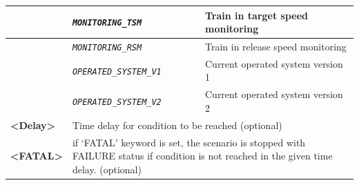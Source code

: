 \begin{itemize}
\begin{longtable}{|l|l|l|}
			\hline

			&	\begin{minipage}[t]{0.40\linewidth} \emph{\texttt{MONITORING\_TSM}} \end{minipage}
			&	\begin{minipage}[t]{0.38\linewidth} Train in target speed monitoring \end{minipage} \\

			\hline

			&	\begin{minipage}[t]{0.40\linewidth} \emph{\texttt{MONITORING\_RSM}} \end{minipage}
			&	\begin{minipage}[t]{0.38\linewidth} Train in release speed monitoring \end{minipage} \\

			\hline
			
			&	\begin{minipage}[t]{0.40\linewidth} \emph{\texttt{OPERATED\_SYSTEM\_V1}} \end{minipage}
			&	\begin{minipage}[t]{0.38\linewidth} Current operated system version 1\end{minipage} \\
			
			\hline
			
			&	\begin{minipage}[t]{0.40\linewidth} \emph{\texttt{OPERATED\_SYSTEM\_V2}} \end{minipage}
			&	\begin{minipage}[t]{0.38\linewidth} Current operated system version 2 \end{minipage} \\
			
			\hline

				\begin{minipage}[t]{0.22\linewidth} \textbf{<Delay>} \end{minipage}
			&	\multicolumn{2}{l|}{ \begin{minipage}[t]{0.78\linewidth} Time delay for condition to be reached (optional) \end{minipage} } \\

			\hline


				\begin{minipage}[t]{0.22\linewidth} \textbf{<FATAL>} \end{minipage}
			&	\multicolumn{2}{l|}{	\begin{minipage}[t]{0.78\linewidth}	if ‘FATAL’ keyword is set, the scenario is stopped with FAILURE status if condition is not reached in the given time delay. (optional)	\end{minipage} } \\


\end{longtable}
\end{itemize}
